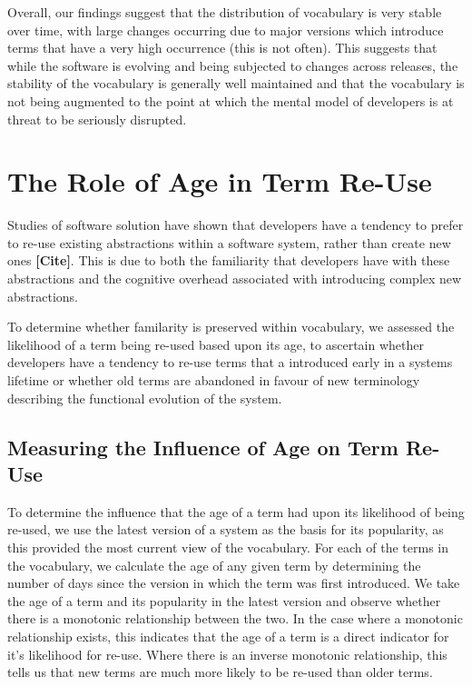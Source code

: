 Overall, our findings suggest that the distribution of vocabulary is very stable over time, with large changes occurring due to major versions which introduce terms that have a very high occurrence (this is not often). This suggests that while the software is evolving and being subjected to changes across releases, the stability of the vocabulary is generally well maintained and that the vocabulary is not being augmented to the point at which the mental model of developers is at threat to be seriously disrupted.



\section{The Role of Age in Term Re-Use} %
\label{sec:the_role_of_age_in_term_re_use}

Studies of software solution have shown that developers have a tendency to prefer to re-use existing abstractions within a software system, rather than create new ones \textbf{[Cite]}. This is due to both the familiarity that developers have with these abstractions and the cognitive overhead associated with introducing complex new abstractions.

To determine whether familarity is preserved within vocabulary, we assessed the likelihood of a term being re-used based upon its age, to ascertain whether developers have a tendency to re-use terms that a introduced early in a systems lifetime or whether old terms are abandoned in favour of new terminology describing the functional evolution of the system.

\subsection{Measuring the Influence of Age on Term Re-Use} %
\label{sub:measuring_the_influence_of_age_on_term_re_use}

To determine the influence that the age of a term had upon its likelihood of being re-used, we use the latest version of a system as the basis for its popularity, as this provided the most current view of the vocabulary. For each of the terms in the vocabulary, we calculate the age of any given term by determining the number of days since the version in which the term was first introduced. We take the age of a term and its popularity in the latest version and observe whether there is a monotonic relationship between the two. In the case where a monotonic relationship exists, this indicates that the age of a term is a direct indicator for it's likelihood for re-use. Where there is an inverse monotonic relationship, this tells us that new terms are much more likely to be re-used than older terms.

